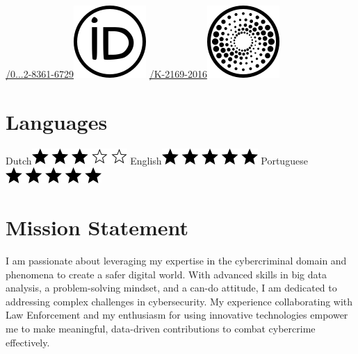 \documentclass[print]{styles/friggeri-cv-mac} %
\begin{document}
\begin{aside}
\href{http://orcid.org/0000-0002-8361-6729}{/0...2-8361-6729}\includegraphics[scale=0.3]{img/orcid.png}
\href{http://www.researcherid.com/rid/K-2169-2016}{/K-2169-2016}\includegraphics[scale=0.3]{img/researchid.png}
~
\section{Languages}
Dutch\includegraphics[scale=0.40]{img/3stars.png}
English\includegraphics[scale=0.40]{img/5stars.png}
Portuguese\includegraphics[scale=0.40]{img/5stars.png}
\end{aside}

\section{Mission Statement}\vspace{-10pt}
I am passionate about leveraging my expertise in the cybercriminal domain and phenomena to create a safer digital world. With advanced skills in big data analysis, a problem-solving mindset, and a can-do attitude, I am dedicated to addressing complex challenges in cybersecurity. My experience collaborating with Law Enforcement and my enthusiasm for using innovative technologies empower me to make meaningful, data-driven contributions to combat cybercrime effectively.
\end{document}
